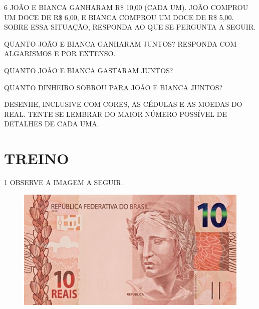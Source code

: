 
\pagebreak

\num{6} JOÃO E BIANCA GANHARAM R\$ 10,00 (CADA UM). JOÃO COMPROU UM DOCE DE R\$ 6,00,
E BIANCA COMPROU UM DOCE DE R\$ 5,00. SOBRE ESSA SITUAÇÃO, RESPONDA AO QUE SE PERGUNTA A SEGUIR.

\begin{escolha}
\item QUANTO JOÃO E BIANCA GANHARAM JUNTOS? RESPONDA COM ALGARISMOS E POR EXTENSO.

\item QUANTO JOÃO E BIANCA GASTARAM JUNTOS?

\item QUANTO DINHEIRO SOBROU PARA JOÃO E BIANCA JUNTOS?

\item DESENHE, INCLUSIVE COM CORES, AS CÉDULAS E AS MOEDAS DO REAL. TENTE SE LEMBRAR DO MAIOR NÚMERO POSSÍVEL DE DETALHES DE CADA UMA.
\end{escolha}

\begin{mdframed}[linewidth=2pt,linecolor=salmao,roundcorner=10pt]
\vspace{7cm}
\end{mdframed}

\pagebreak
\section{TREINO}

\num{1} OBSERVE A IMAGEM A SEGUIR.


\begin{figure}[htpb!]
\centering
\includegraphics[width=\textwidth]{./media/SAEB_1ANO_MAT_FIGURA82.jpg}
\end{figure}

